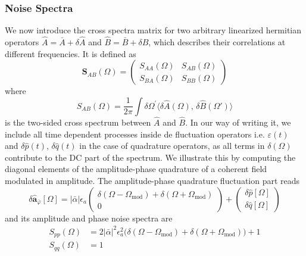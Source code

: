 \subsubsection{Noise Spectra}
We now introduce the cross spectra matrix for two arbitrary linearized hermitian operators $\hat{A}=\bar{A}+\delta \hat{A}$ and $\hat{B}=\bar{B}+\delta \hat{B}$, which describes their correlations at different frequencies. It is defined as 
\begin{equation}
  \mathbf{S}_{AB}(\Omega) = \begin{pmatrix}
  S_{AA}(\Omega) & S_{AB}(\Omega) \\
  S_{BA}(\Omega) & S_{BB}(\Omega) 
  \end{pmatrix}
\end{equation}
where 
\begin{equation}
   S_{AB}(\Omega) = \frac{1}{2\pi} \int \delta \Omega^{'} \langle \delta \hat{A}(\Omega),\,\delta \hat{B}(\Omega')  \rangle
\label{eq:SAB}
\end{equation}
is the two-sided cross spectrum between $\hat{A}$ and $\hat{B}$. In our way of writing it, we include all time dependent processes inside de fluctuation operators i.e. $\varepsilon(t)$ and $\delta \hat{p}(t)$, $\delta \hat{q}(t)$ in the case of quadrature operators, as all terms in $\delta (\Omega)$ contribute to the DC part of the spectrum. We illustrate this by computing the diagonal elements of the amplitude-phase quadrature of a coherent field modulated in amplitude. The amplitude-phase quadrature fluctuation part reads
\begin{equation}
  \delta \hat{\mathbf a}_{\bar{\varphi}}[\Omega] = |\bar{\alpha}|\epsilon_a \begin{pmatrix}
  \delta(\Omega - \Omega_{\text{mod}}) +\delta(\Omega + \Omega_{\text{mod}}) \\
  0 
\end{pmatrix}
+ \begin{pmatrix}
  \delta \hat{p}[\Omega] \\
  \delta \hat{q}[\Omega]
\end{pmatrix}
\end{equation}
and its amplitude and phase noise spectra are
\begin{equation}
  \begin{split}
    S_{pp}(\Omega) & = 2|\bar{\alpha}|^2 \epsilon_a^2 \Big(\delta(\Omega - \Omega_{\text{mod}}) +\delta(\Omega + \Omega_{\text{mod}}) \Big) + 1\\
    S_{qq}(\Omega) & = 1
  \end{split}
\end{equation}





